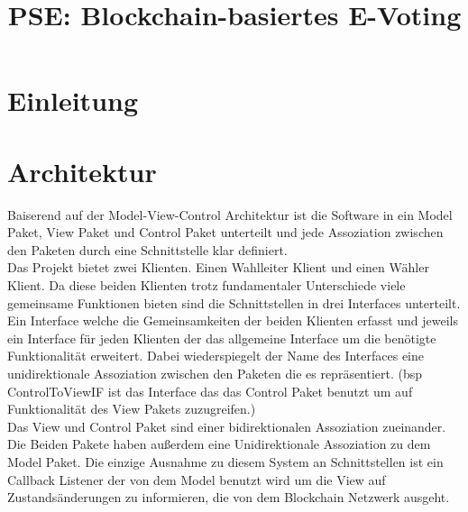 \documentclass[parskip=full]{scrartcl}
\title{PSE: Blockchain-basiertes E-Voting}
\begin{document}
	\clearpage
	\maketitle
	\newpage
	
	\tableofcontents
	\newpage
	\section{Einleitung}
	
	\section{Architektur}
	Baiserend auf der Model-View-Control Architektur ist die Software in ein Model Paket, View Paket und Control Paket unterteilt und jede Assoziation zwischen den Paketen durch eine Schnittstelle klar definiert. 
	\\
	Das Projekt bietet zwei Klienten. Einen Wahlleiter Klient und einen Wähler Klient. Da diese beiden Klienten trotz fundamentaler Unterschiede viele gemeinsame Funktionen bieten sind die Schnittstellen in drei Interfaces unterteilt. Ein Interface welche die Gemeinsamkeiten der beiden Klienten erfasst und jeweils ein Interface für jeden Klienten der das allgemeine Interface um die benötigte Funktionalität erweitert. Dabei wiederspiegelt der Name des Interfaces eine unidirektionale Assoziation zwischen den Paketen die es repräsentiert. (bsp ControlToViewIF ist das Interface das das Control Paket benutzt um auf Funktionalität des View Pakets zuzugreifen.)
	\\
	Das View und Control Paket sind einer bidirektionalen Assoziation zueinander. Die Beiden Pakete haben außerdem eine Unidirektionale Assoziation zu dem Model Paket. Die einzige Ausnahme zu diesem System an Schnittstellen ist ein Callback Listener der von dem Model benutzt wird um die View auf Zustandsänderungen zu informieren, die von dem Blockchain Netzwerk ausgeht.
	\\
\end{document}
